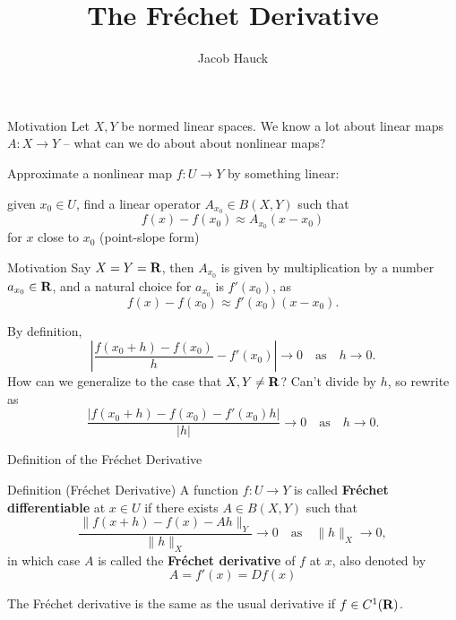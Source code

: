 \documentclass[]{beamer}
\title{The Fréchet Derivative}
\author{Jacob Hauck}
\institute{Math 6418}
\date{}
\begin{document}
	\frame{\titlepage}
	
	\begin{frame}{Motivation}
		Let $X,Y$ be normed linear spaces. We know a lot about linear maps $A : X \to Y$ -- what can we do about about nonlinear maps?
		\vfill
		\pause
		
		Approximate a nonlinear map $f : U \to Y$ by something linear:
		\pause
		
		given $x_0 \in U$, find a linear operator $A_{x_0} \in B(X,Y)$ such that
		\begin{equation*}
			f(x) - f(x_0) \approx A_{x_0}(x-x_0)
		\end{equation*}
		for $x$ close to $x_0$ (point-slope form)
		\vfill
		\pause
	\end{frame}
	
	\begin{frame}{Motivation}
		Say $X = Y = \textnormal{\bf R}$, then $A_{x_0}$ is given by multiplication by a number $a_{x_0} \in \textnormal{\bf R}$, and a natural choice for $a_{x_0}$ is $f'(x_0)$, as
		\begin{equation*}
			f(x) - f(x_0) \approx f'(x_0)(x-x_0).
		\end{equation*}
		\vfill
		\pause
		
		By definition,
		\begin{equation*}
			\left|\frac{f(x_0+h) - f(x_0)}{h} - f'(x_0)\right| \to 0 \quad\text{as}\quad h\to 0.
		\end{equation*}
		\pause
		How can we generalize to the case that $X,Y \ne \textnormal{\bf R}$? Can't divide by $h$, so rewrite as
		\begin{equation*}
			\frac{|f(x_0+h) - f(x_0) - f'(x_0)h|}{|h|} \to 0 \quad \text{as}\quad h\to0.
		\end{equation*}
	\end{frame}
	
	\begin{frame}{Definition of the Fréchet Derivative}
		\begin{block}{Definition (Fréchet Derivative)}
		A function $f : U \to Y$ is called \textbf{Fréchet differentiable} at $x \in U$ if there exists $A \in B(X,Y)$ such that
		\begin{equation*}
			\frac{\lVert f(x+h) - f(x) - Ah \rVert_Y}{\lVert h \rVert_X} \to 0 \quad \text{as} \quad \lVert h\rVert_X\to 0,
		\end{equation*}
		in which case $A$ is called the \textbf{Fréchet derivative} of $f$ at $x$, also denoted by
		\begin{equation*}
			A = f'(x) = Df(x)
		\end{equation*}
		\end{block}
		\vfill
		\pause
		
		The Fréchet derivative is the same as the usual derivative if $f \in C^1(\textnormal{\bf R})$.
	\end{frame}
	
\end{document}
